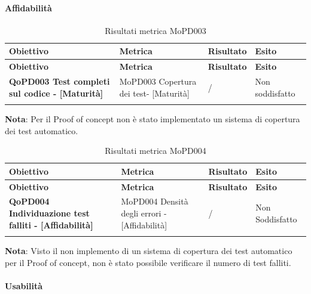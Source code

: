 \documentclass[../piano-di-qualifica.tex]{subfiles}
\begin{document}
\paragraph{Affidabilità}
\label{sub:affidabilita}

\renewcommand{\arraystretch}{2} %
\begin{longtable}[H]{>{\centering\bfseries}m{5cm} >{\centering}m{5cm} >{\centering}m{2.5cm} >{\centering\arraybackslash}m{2.5cm}}  
  \rowcolor{lightgray}
  {\textbf{Obiettivo}} & {\textbf{Metrica}} & {\textbf{Risultato}} & {\textbf{Esito}}  \\
  \endfirsthead%
  \rowcolor{lightgray}
  {\textbf{Obiettivo}} & {\textbf{Metrica}} & {\textbf{Risultato}} & {\textbf{Esito}}  \\
  \endhead%
  \textbf{QoPD003 Test completi sul codice - [Maturità]} & MoPD003 Copertura dei test- [Maturità] & / & Non soddisfatto \\
  \caption{Risultati metrica MoPD003}
  \label{tab:my-table}
\end{longtable}
\textbf{Nota}: Per il Proof of concept non è stato implementato un sistema di copertura dei test automatico.

\renewcommand{\arraystretch}{2} %
\begin{longtable}[H]{>{\centering\bfseries}m{5cm} >{\centering}m{5cm} >{\centering}m{2.5cm} >{\centering\arraybackslash}m{2.5cm}}  
  \rowcolor{lightgray}
  {\textbf{Obiettivo}} & {\textbf{Metrica}} & {\textbf{Risultato}} & {\textbf{Esito}}  \\
  \endfirsthead%
  \rowcolor{lightgray}
  {\textbf{Obiettivo}} & {\textbf{Metrica}} & {\textbf{Risultato}} & {\textbf{Esito}}  \\
  \endhead%
  \textbf{QoPD004 Individuazione test falliti - [Affidabilità]} & MoPD004 Densità degli errori - [Affidabilità] & / & Non Soddisfatto \\
  \caption{Risultati metrica MoPD004}
  \label{tab:my-table}
\end{longtable}
\textbf{Nota}: Visto il non implemento di un sistema di copertura dei test automatico per il Proof of concept, non è stato possibile verificare il numero di test falliti.

\paragraph{Usabilità}
\label{sub:usabilita}
\end{document}
